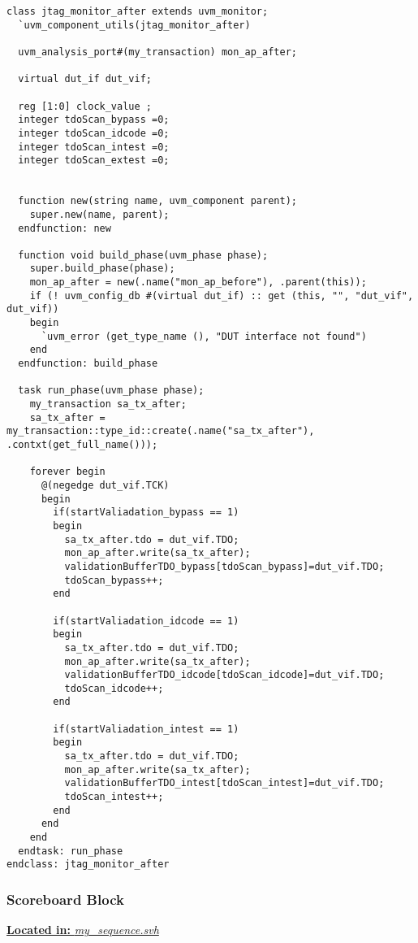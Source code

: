 \documentclass[a4paper,11pt]{article}
\begin{document}
\begin{lstlisting}[style={verilog-style}, backgroundcolor=\color{lightgray}]
class jtag_monitor_after extends uvm_monitor;
  `uvm_component_utils(jtag_monitor_after)
 
  uvm_analysis_port#(my_transaction) mon_ap_after;
 
  virtual dut_if dut_vif;

  reg [1:0] clock_value ;
  integer tdoScan_bypass =0;
  integer tdoScan_idcode =0;
  integer tdoScan_intest =0;
  integer tdoScan_extest =0;


  function new(string name, uvm_component parent);
    super.new(name, parent);
  endfunction: new

  function void build_phase(uvm_phase phase);
    super.build_phase(phase);
    mon_ap_after = new(.name("mon_ap_before"), .parent(this));
    if (! uvm_config_db #(virtual dut_if) :: get (this, "", "dut_vif", dut_vif)) 
    begin
      `uvm_error (get_type_name (), "DUT interface not found")		
    end
  endfunction: build_phase

  task run_phase(uvm_phase phase);
    my_transaction sa_tx_after;
    sa_tx_after = my_transaction::type_id::create(.name("sa_tx_after"), .contxt(get_full_name()));

    forever begin
      @(negedge dut_vif.TCK)
      begin					
        if(startValiadation_bypass == 1)
        begin
          sa_tx_after.tdo = dut_vif.TDO;
          mon_ap_after.write(sa_tx_after);
          validationBufferTDO_bypass[tdoScan_bypass]=dut_vif.TDO;
          tdoScan_bypass++;
        end

        if(startValiadation_idcode == 1)
        begin
          sa_tx_after.tdo = dut_vif.TDO;
          mon_ap_after.write(sa_tx_after);
          validationBufferTDO_idcode[tdoScan_idcode]=dut_vif.TDO;
          tdoScan_idcode++;
        end

        if(startValiadation_intest == 1)
        begin
          sa_tx_after.tdo = dut_vif.TDO;
          mon_ap_after.write(sa_tx_after);
          validationBufferTDO_intest[tdoScan_intest]=dut_vif.TDO;
          tdoScan_intest++;
        end
      end
    end
  endtask: run_phase
endclass: jtag_monitor_after
\end{lstlisting}

\FloatBarrier
\subsubsection{Scoreboard Block}
\underline{\textbf{Located in:} \textit{my\_sequence.svh}}\\
\end{document}

